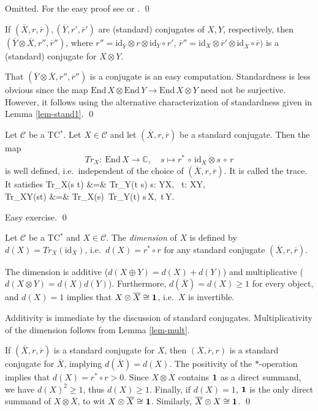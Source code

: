 \documentclass[11pt]{article}
\theoremstyle{definition}
\theoremstyle{definition}
\theoremstyle{remark}
\def\2#1{{\mathcal #1}}
\def\7#1{{\mathbb #1}}
\def\1#1{{\bf #1}}
\def\ol#1{{\overline #1}}
\newcommand{\End}{\mathrm{End}}
\newcommand{\mcirc}{\,\circ\,}
\newcommand{\rarr}{\rightarrow}
\def\id{\mathrm{id}}
\newcounter{bean}
\begin{document}
\prf Omitted. For the easy proof see \cite{LR} or \cite{mue06}.
\qed




\blemma \label{lem-mult}
If $(\ol{X},r,\ol{r}),(\ol{Y},r',\ol{r}')$ are (standard) conjugates of $X,Y$, respectively, then
$(\ol{Y}\otimes\ol{X}, r'',\ol{r}'')$, where $r''=\id_{\ol{Y}}\otimes r\otimes\id_Y\circ r'$,
$\ol{r}''=\id_X\otimes\ol{r'}\otimes\id_{\ol{X}}\circ\ol{r})$ 
is a (standard) conjugate for $X\otimes Y$.
\elemma

\prf That $(\ol{Y}\otimes\ol{X}, r'',\ol{r}'')$ is a conjugate is an easy computation. Standardness
is less obvious since the map $\End\,X\otimes\End\,Y\rarr\End\,X\otimes Y$ need not be
surjective. However, it follows using the alternative characterization of standardness given in
Lemma \ref{lem-stand1}.
\qed

\bprop \label{prop-trace} 
Let $\2C$ be a TC$^*$. Let
$X\in\2C$ and let $(\ol{X}, r,\ol{r})$ be a standard conjugate. Then the map
\[ Tr_X: \ \End\,X\rarr\7C,\quad s\mapsto r^*\mcirc \id_{\ol{X}}\otimes s\mcirc r \]
is well defined, i.e.\ independent of the choice of $(\ol{X}, r,\ol{r})$. It is called the trace. It
satisfies
\bean Tr_X(s\mcirc  t) &=& Tr_Y(t\mcirc  s) \quad\forall s: Y\rarr X, \ t: X\rarr Y,  \\
  Tr_{X\otimes Y}(s\otimes t) &=& Tr_X(s)\, Tr_Y(t) \quad\forall s\in\End\,X,\ t\in\End\,Y. 
\eean
\eprop

\prf Easy exercise. \qed

\bdefin {}
Let $\2C$ be a TC$^*$ and $X\in\2C$. The \emph{dimension} of $X$ is defined by
$d(X)=Tr_X(\id_X)$, i.e.\ $d(X)=r^*\circ r$ for any standard conjugate $(\ol{X},r,\ol{r})$. 
\edefin

\blemma \label{lem-dim}
The dimension is additive ($d(X\oplus Y)=d(X)+d(Y)$) and multiplicative ($d(X\otimes Y)=d(X)d(Y)$).
Furthermore, $d(\ol{X})=d(X)\ge 1$ for every object, and $d(X)=1$ implies that $X\otimes\ol{X}\cong\11$,
i.e.\ $X$ is invertible.
\elemma

\prf Additivity is immediate by the discussion of standard conjugates. Multiplicativity of the
dimension follows from Lemma \ref{lem-mult}.

If $(\ol{X},r,\ol{r})$ is a standard conjugate for $X$, then $(X,\ol{r},r)$ is a standard conjugate
for $\ol{X}$, implying $d(\ol{X})=d(X)$. The positivity of the $*$-operation implies that
$d(X)=r^*\circ r>0$. Since $X\otimes\ol{X}$ contains $\11$ as a direct summand, we have
$d(X)^2\ge 1$, thus $d(X)\ge 1$. Finally, if $d(X)=1$, $\11$ is the only direct summand of
$X\otimes\ol{X}$, to wit $X\otimes\ol{X}\cong\11$. Similarly, $\ol{X}\otimes X\cong\11$.
\qed
\end{document}
